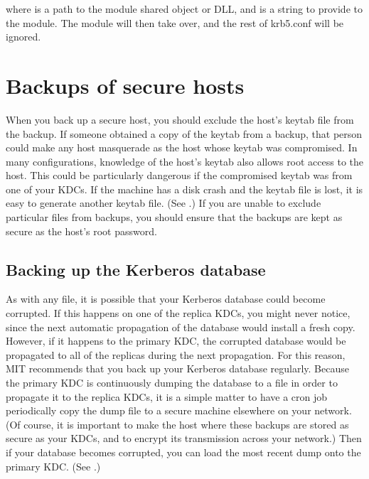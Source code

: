 \documentclass[letterpaper,10pt,english]{sphinxmanual}
\begin{document}
\begin{sphinxVerbatim}[commandchars=\\\{\}]
 
\end{sphinxVerbatim}

\sphinxAtStartPar
where  is a path to the module shared object or DLL, and
 is a string to provide to the module.  The module will then
take over, and the rest of krb5.conf will be ignored.

\sphinxstepscope


\chapter{Backups of secure hosts}
\label{\detokenize{admin/backup_host:backups-of-secure-hosts}}\label{\detokenize{admin/backup_host::doc}}
\sphinxAtStartPar
When you back up a secure host, you should exclude the host’s keytab
file from the backup.  If someone obtained a copy of the keytab from a
backup, that person could make any host masquerade as the host whose
keytab was compromised.  In many configurations, knowledge of the
host’s keytab also allows root access to the host.  This could be
particularly dangerous if the compromised keytab was from one of your
KDCs.  If the machine has a disk crash and the keytab file is lost, it
is easy to generate another keytab file.  (See {\hyperref[\detokenize{admin/appl_servers:add-princ-kt}]{}}.)
If you are unable to exclude particular files from backups, you should
ensure that the backups are kept as secure as the host’s root
password.


\section{Backing up the Kerberos database}
\label{\detokenize{admin/backup_host:backing-up-the-kerberos-database}}
\sphinxAtStartPar
As with any file, it is possible that your Kerberos database could
become corrupted.  If this happens on one of the replica KDCs, you
might never notice, since the next automatic propagation of the
database would install a fresh copy.  However, if it happens to the
primary KDC, the corrupted database would be propagated to all of the
replicas during the next propagation.  For this reason, MIT recommends
that you back up your Kerberos database regularly.  Because the primary
KDC is continuously dumping the database to a file in order to
propagate it to the replica KDCs, it is a simple matter to have a cron
job periodically copy the dump file to a secure machine elsewhere on
your network.  (Of course, it is important to make the host where
these backups are stored as secure as your KDCs, and to encrypt its
transmission across your network.)  Then if your database becomes
corrupted, you can load the most recent dump onto the primary KDC.
(See {\hyperref[\detokenize{admin/database:restore-from-dump}]{}}.)
\end{document}
